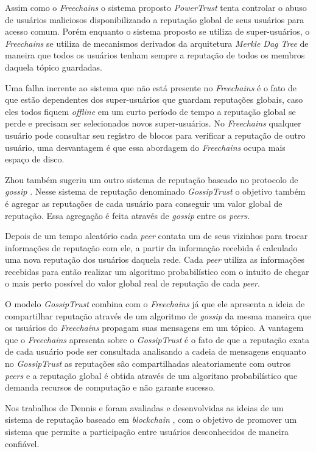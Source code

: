 \documentclass[12pt]{article}
\newcommand{\FC} {\emph{Freechains}\xspace}
\begin{document}
Assim como o \FC o sistema proposto \emph{PowerTrust} tenta controlar o abuso de usuários maliciosos disponibilizando a reputação global de seus usuários para acesso comum. Porém enquanto o sistema proposto se utiliza de super-usuários, o \FC se utiliza de mecanismos derivados da arquitetura \emph{Merkle Dag Tree} de maneira que todos os usuários tenham sempre a reputação de todos os membros daquela tópico guardadas. 

Uma falha inerente ao sistema que não está presente no \FC é o fato de que estão dependentes dos super-usuários que guardam reputações globais, caso eles todos fiquem \emph{offline} em um curto período de tempo a reputação global se perde e precisam ser selecionados novos super-usuários. No \FC qualquer usuário pode consultar seu registro de blocos para verificar a reputação de outro usuário, uma desvantagem é que essa abordagem do \FC ocupa mais espaço de disco.

Zhou também sugeriu um outro sistema de reputação baseado no protocolo de \emph{gossip} \cite{zhou2007gossip}. Nesse sistema de reputação denominado \emph{GossipTrust} o objetivo também é agregar as reputações de cada usuário para conseguir um valor global de reputação. Essa agregação é feita através de \emph{gossip} entre os \emph{peers}.

Depois de um tempo aleatório cada \emph{peer} contata um de seus vizinhos para trocar informações de reputação com ele, a partir da informação recebida é calculado uma nova reputação dos usuários daquela rede. Cada \emph{peer} utiliza as informações recebidas para então realizar um algoritmo probabilístico com o intuito de chegar o mais perto possível do valor global real de reputação de cada \emph{peer}.

O modelo \emph{GossipTrust} combina com o \FC já que ele apresenta a ideia de compartilhar reputação através de um algoritmo de \emph{gossip} da mesma maneira que os usuários do \FC propagam suas mensagens em um tópico. A vantagem que o \FC apresenta sobre o \emph{GossipTrust} é o fato de que a reputação exata de cada usuário pode ser consultada analisando a cadeia de mensagens enquanto no \emph{GossipTrust} as reputações são compartilhadas aleatoriamente com outros \emph{peers} e a reputação global é obtida através de um algoritmo probabilístico que demanda recursos de computação e não garante sucesso. 

Nos trabalhos de Dennis e  foram avaliadas e desenvolvidas as ideias de um sistema de reputação baseado em \emph{blockchain} \cite{dennis2015rep} \cite{dennis2016rep}, com o objetivo de promover um sistema que permite a participação entre usuários desconhecidos de maneira confiável. 
\end{document}
